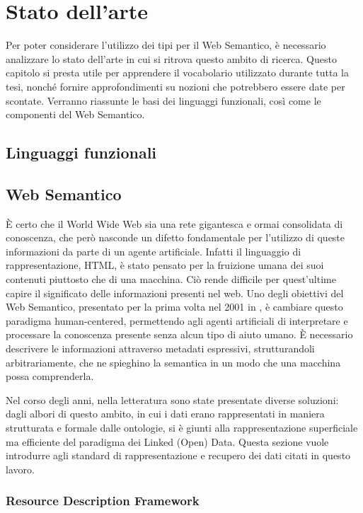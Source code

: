 \chapter[Stato dell'arte]{Stato dell'arte}
Per poter considerare l'utilizzo dei tipi per il Web Semantico, è necessario analizzare lo stato dell'arte in cui si ritrova questo ambito di ricerca.
Questo capitolo si presta utile per apprendere il vocabolario utilizzato durante tutta la tesi, nonché fornire approfondimenti su nozioni che potrebbero essere date per scontate.
Verranno riassunte le basi dei linguaggi funzionali, così come le componenti del Web Semantico.
\section[Linguaggi funzionali]{Linguaggi funzionali}
\section[Web Semantico]{Web Semantico}
È certo che il World Wide Web sia una rete gigantesca e ormai consolidata di conoscenza, che però nasconde un difetto fondamentale per l'utilizzo di queste informazioni da parte di un agente artificiale. Infatti il linguaggio di rappresentazione, HTML, è stato pensato per la fruizione umana dei suoi contenuti piuttosto che di una macchina. Ciò rende difficile per quest'ultime capire il significato delle informazioni presenti nel web. Uno degli obiettivi del Web Semantico, presentato per la prima volta nel 2001 in \cite{berners2001semantic}, è cambiare questo paradigma human-centered, permettendo agli agenti artificiali di interpretare e processare la conoscenza presente senza alcun tipo di aiuto umano. È necessario descrivere le informazioni attraverso metadati espressivi, strutturandoli arbitrariamente, che ne spieghino la semantica in un modo che una macchina possa comprenderla.

Nel corso degli anni, nella letteratura sono state presentate diverse soluzioni: dagli albori di questo ambito, in cui i dati erano rappresentati in maniera strutturata e formale dalle ontologie, si è giunti alla rappresentazione superficiale ma efficiente del paradigma dei Linked (Open) Data. Questa sezione vuole introdurre agli standard di rappresentazione e recupero dei dati citati in questo lavoro.

\subsection[Resource Description Framework]{Resource Description Framework}
